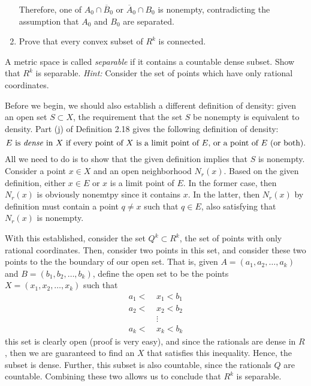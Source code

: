 \documentclass[10pt]{article}
\begin{document}
\begin{problem}
\begin{enumerate}[label=\alph*)]
\begin{solution}
					Therefore, one of \( A_0 \cap \overline B_0 \) or \( \overline A_0 \cap B_0 \) is nonempty, 
					contradicting the assumption that \( A_0 \) and \( B_0 \) are separated. 
				\end{solution}
			\item Prove that every convex subset of \( R^{k} \) is connected. 

				\begin{solution}
				\end{solution}
		\end{enumerate}
	\end{problem}

	\begin{problem}
		A metric space is called \textit{separable} if it contains a countable dense subset. Show that \( R^{k} \) 
		is separable. \textit{Hint:} Consider the set of points which have only rational coordinates.  
	\end{problem}

	\begin{solution}
		Before we begin, we should also establish a different definition of density: given an open set \( S \subset 
		X\), the requirement that the set \( S \) be nonempty is equivalent to density. Part (j) of 
		Definition 2.18 gives the following definition of density:
		\[
			\text{\( E \) is \textit{dense} in \( X \) if every point of \( X \) is a limit point of \( E \), or 
			a point of \( E \) (or both).}
		\] 
		All we need to do is to show that the given definition implies that \( S \) is nonempty. Consider 
		a point \( x \in X \) and an open neighborhood \( N_r(x) \). Based on the given definition, either 
		\( x \in E\) or \( x \) is a limit point of \( E \). In the former case, then \( N_r(x) \) is obviously 
		nonemtpy since it contains \( x \). In the latter, then \( N_r(x) \) by definition must contain 
		a point \( q \neq x \) such that \( q \in E \), also satisfying that \( N_r(x) \) is nonempty. 

		With this established, consider the set \( Q^{k} \subset R^{k} \), the set of points with only rational 
		coordinates. Then, consider two points in this set, and consider these two points to the the boundary 
		of our open set. That is, given \( A = (a_1, a_2, \dots, a_k) \) and \( B = (b_1, b_2, \dots, b_k) \), 
		define the open set to be the points \( X = (x_1, x_2, \dots, x_k)  \) such that 
		\begin{align*}
			a_1 < \ &x_1 < b_1\\
			a_2 < \ &x_2 < b_2\\
				  &\vdots\\
			a_k < \ &x_k < b_k
		\end{align*}
		this set is clearly open (proof is very easy), and since the rationals are dense in \( R \), then we are 
		guaranteed to find an \( X \) that satisfies this inequality. Hence, the subset is dense. Further, this 
		subset is also countable, since the rationals \( Q \) are countable. Combining these two allows us 
		to conclude that \( R^{k} \) is separable. 
	\end{solution}
	
\end{document}
